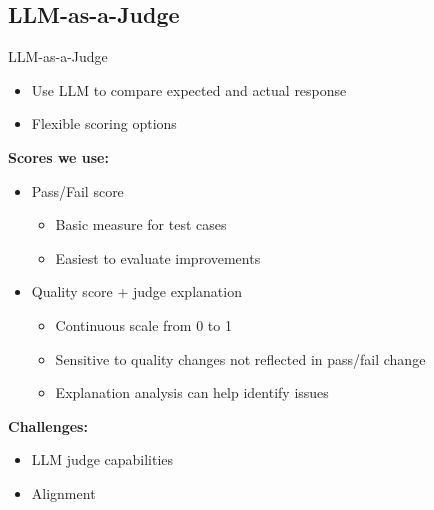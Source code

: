 \documentclass{sdqbeamer}[smallfoot]
\begin{document}
\subsection{LLM-as-a-Judge}
\begin{frame}[picture 50 vertical,picture=images/failure_reason_wordcloud,kitlogo=black]{LLM-as-a-Judge}
    \vspace{-1.5cm}
    \begin{itemize}
        \item Use LLM to compare expected and actual response
        \item Flexible scoring options
    \end{itemize}
    \vspace{0.5cm}
    \textbf{Scores we use:}
    \begin{itemize}
        \item Pass/Fail score
            \begin{itemize}
                \item Basic measure for test cases
                \item Easiest to evaluate improvements
            \end{itemize}
        \item Quality score + judge explanation
            \begin{itemize}
                \item Continuous scale from 0 to 1
                \item Sensitive to quality changes not reflected in pass/fail change
                \item Explanation analysis can help identify issues
            \end{itemize}
    \end{itemize}
    \vspace{0.5cm}
    \textbf{Challenges:}
    \begin{itemize}
        \item LLM judge capabilities
        \item Alignment
    \end{itemize}
\end{frame}
\end{document}
